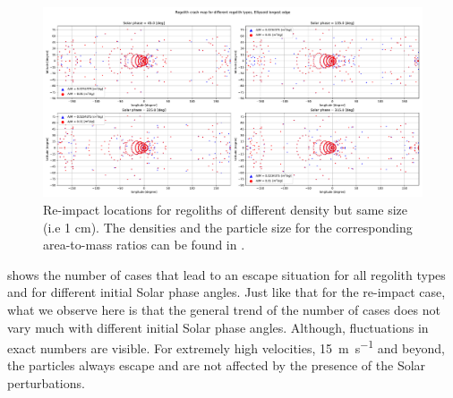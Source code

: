 \begin{figure}[htb]
\centering
\captionsetup{justification=centering}
\includegraphics[angle=90, width=\textwidth, height=\textheight, keepaspectratio=true]{longest_edge_perturbations/multiple_regolith_types/allPhases_crashMap_3P2_7P5_density_1cm_Radius.pdf}
\caption{Re-impact locations for regoliths of different density but same size (i.e 1 cm). The densities and the particle size for the corresponding area-to-mass ratios can be found in .}
\label{fig:crashmap_3.2_7.5_density_1cmRadius}
\end{figure}
\FloatBarrier
 shows the number of cases that lead to an escape situation for all regolith types and for different initial Solar phase angles. Just like that for the re-impact case, what we observe here is that the general trend of the number of cases does not vary much with different initial Solar phase angles. Although, fluctuations in exact numbers are visible. For extremely high velocities, \SI{15}{\metre\per\second} and beyond, the particles always escape and are not affected by the presence of the Solar perturbations.
%
\newline\newline
%
